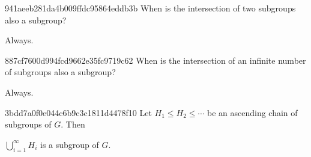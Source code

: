 \begin{note}{941aeeb281da4b009ffdc95864eddb3b}
    When is the intersection of two subgroups also a subgroup?

    \begin{cloze}{1}
        Always.
    \end{cloze}
\end{note}

\begin{note}{887cf7600d994fcd9662e35fc9719c62}
    When is the intersection of an infinite number of subgroups also a subgroup?

    \begin{cloze}{1}
        Always.
    \end{cloze}
\end{note}

\begin{note}{3bdd7a0f0e044c6b9c3c1811d4478f10}
    Let \({ H_1 \leq H_2 \leq \cdots }\) be an ascending chain of subgroups of \({ G }\).
    Then \begin{icloze}{1}\({ \bigcup_{i=1}^{\infty} H_i }\) is a subgroup of \({ G }\).\end{icloze}
\end{note}



